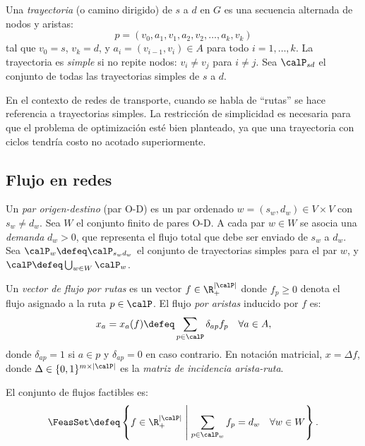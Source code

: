 \begin{definition}[Trayectoria]
Una \emph{trayectoria} (o camino dirigido) de $s$ a $d$ en $G$ es una secuencia alternada de nodos y aristas:
\[
p = (v_0, a_1, v_1, a_2, v_2, \ldots, a_k, v_k)
\]
tal que $v_0 = s$, $v_k = d$, y $a_i = (v_{i-1}, v_i) \in A$ para todo $i = 1, \ldots, k$. La trayectoria es \emph{simple} si no repite nodos: $v_i \neq v_j$ para $i \neq j$. Sea $\calP_{sd}$ el conjunto de todas las trayectorias simples de $s$ a $d$.
\end{definition}

\begin{remark}
En el contexto de redes de transporte, cuando se habla de ``rutas'' se hace referencia a trayectorias simples. La restricción de simplicidad es necesaria para que el problema de optimización esté bien planteado, ya que una trayectoria con ciclos tendría costo no acotado superiormente.
\end{remark}

\subsection{Flujo en redes}

\begin{definition}
Un \emph{par origen-destino} (par O-D) es un par ordenado $w = (s_w, d_w) \in V \times V$ con $s_w \neq d_w$. Sea $W$ el conjunto finito de pares O-D. A cada par $w \in W$ se asocia una \emph{demanda} $d_w > 0$, que representa el flujo total que debe ser enviado de $s_w$ a $d_w$. Sea $\calP_w \defeq \calP_{s_w d_w}$ el conjunto de trayectorias simples para el par $w$, y $\calP \defeq \bigcup_{w \in W} \calP_w$.
\end{definition}

\begin{definition}
Un \emph{vector de flujo por rutas} es un vector $f \in \R^{|\calP|}_+$ donde $f_p \geq 0$ denota el flujo asignado a la ruta $p \in \calP$. El flujo \emph{por aristas} inducido por $f$ es:
\[
x_a = x_a(f) \defeq \sum_{p \in \calP} \delta_{ap} f_p \quad \forall a \in A,
\]
donde $\delta_{ap} = 1$ si $a \in p$ y $\delta_{ap} = 0$ en caso contrario. En notación matricial, $x = \Delta f$, donde $\Delta \in \{0,1\}^{m \times |\calP|}$ es la \emph{matriz de incidencia arista-ruta}.
\end{definition}

\begin{definition}
El conjunto de flujos factibles es:
\[
\FeasSet \defeq \left\{ f \in \R^{|\calP|}_+ \;\middle|\; \sum_{p \in \calP_w} f_p = d_w \quad \forall w \in W \right\}.
\]
\end{definition}

